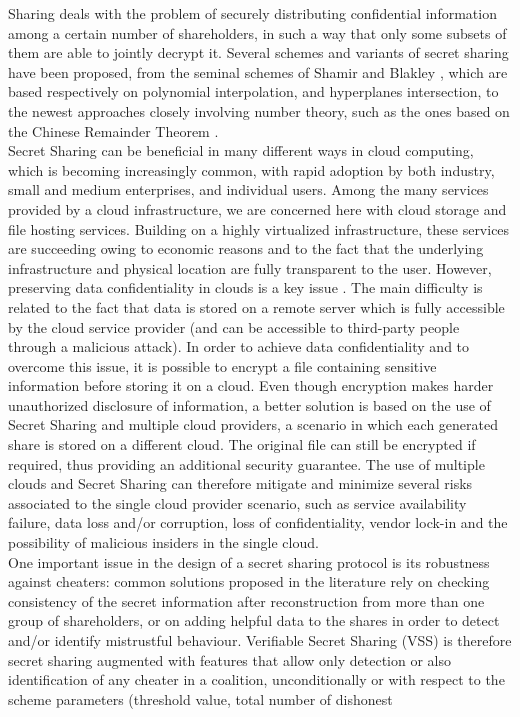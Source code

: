 \documentclass[10pt,journal,cspaper,compsoc]{IEEEtran}
\begin{document}
  Sharing deals with the problem of securely distributing confidential information among a certain number of shareholders, in such a way that only some subsets of them are able to jointly decrypt it. Several schemes and variants of secret sharing have been proposed, from the seminal schemes of Shamir  \cite{journals/cacm/Shamir79} and Blakley  \cite{Blakley1979}, which are based respectively on polynomial interpolation, and hyperplanes intersection, to the newest approaches closely involving number theory, such as the ones based on the Chinese Remainder Theorem  \cite{Mignotte} \cite{Asmuth}. \\Secret Sharing can be beneficial in many different ways in cloud computing, which is becoming increasingly common, with rapid adoption by both industry, small and medium enterprises, and individual users. Among the many services provided by a cloud infrastructure, we are concerned here with cloud storage and file hosting services. Building on a highly virtualized infrastructure, these services are succeeding owing to economic reasons and to the fact that the underlying infrastructure and physical location are fully transparent to the user. However, preserving data confidentiality in clouds is a key issue  \cite{Tysowski}.
The main difficulty is related to the fact that data is stored on a remote server which is fully accessible by the cloud service provider (and can be accessible to third-party people through a malicious attack). In order to achieve data confidentiality and to overcome this issue, it is possible to encrypt a file containing sensitive information before storing it on a cloud. Even though encryption makes harder unauthorized disclosure of information, a better solution is based on the use of Secret Sharing and multiple cloud providers, a scenario in which each generated share is stored on a different cloud. The original file can still be encrypted if required, thus providing an additional security guarantee. The use of multiple clouds and Secret Sharing can therefore mitigate and minimize several risks associated to the single cloud provider scenario, such as service availability failure, data loss and/or corruption, loss of confidentiality, vendor lock-in and the possibility of malicious insiders in the single cloud.\\
One important issue in the design of a secret sharing protocol is its robustness against cheaters: common solutions proposed in the literature rely on checking consistency of the secret information after reconstruction from more than one group of shareholders, or on adding helpful data to the shares in order to detect and/or identify mistrustful behaviour. Verifiable Secret Sharing (VSS) \cite{Chor} is therefore secret sharing augmented with features that allow only detection or also identification of any cheater in a coalition, unconditionally or with respect to the scheme parameters (threshold value, total number of dishonest
\end{document}
